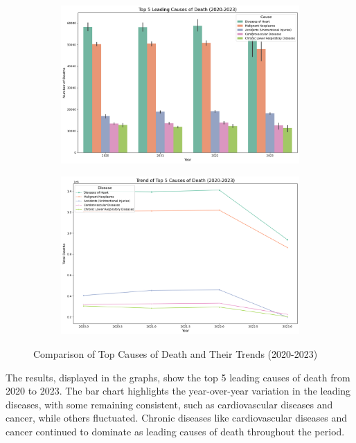 \documentclass[a4paper,10pt]{article}
\begin{document}
\begin{figure}[ht!]
	\centering
	\begin{subfigure}[t]{0.48\textwidth}
		\centering
		\includegraphics[width=\textwidth]{images/graph-2.png} %
		\label{fig:comparison-bar}
	\end{subfigure}
	\hfill
	\begin{subfigure}[t]{0.48\textwidth}
		\centering
		\includegraphics[width=\textwidth]{images/graph-3.png} %
		\label{fig:comparison-trend}
	\end{subfigure}
	\caption{Comparison of Top Causes of Death and Their Trends (2020-2023)}
\end{figure}

The results, displayed in the graphs, show the top 5 leading causes of death from 2020 to 2023. The bar chart highlights the year-over-year variation in the leading diseases, with some remaining consistent, such as cardiovascular diseases and cancer, while others fluctuated. Chronic diseases like cardiovascular diseases and cancer continued to dominate as leading causes of death throughout the period.
\end{document}
